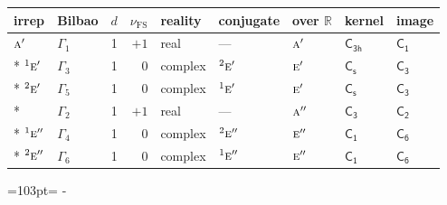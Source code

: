 \documentclass[10pt,a4paper]{article}
\newcommand{\needspace}[1]{\par\penalty-100\begingroup\dimen0=#1\relax\dimen2=\pagegoal
  \advance\dimen2-\pagetotal\ifdim\dimen0>\dimen2\relax\ifdim\dimen2>0pt\vfil\break\fi\fi
  \endgroup}
\numberwithin{equation}{section}
\newcommand{\grp}[1]{\mathsf{#1}}
\newcommand{\irr}[1]{\text{\normalfont\scshape #1}}
\newcommand{\conjpair}[1]{{}^{#1}}
\newcommand{\detbox}[1]{{\setlength{\fboxsep}{1pt}\fbox{#1}}}
\newcommand{\fsind}{\nu_{\mathrm{FS}}}
\begin{document}
{\small\renewcommand{\arraystretch}{1.25}\setlength{\tabcolsep}{4pt}\begin{longtable}{@{}llrrlllll@{}}\toprule
irrep & Bilbao & $d$ & $\fsind$ & reality & conjugate & over $\mathbb{R}$ & kernel & image\\\midrule\endhead
\bottomrule\endfoot\endlastfoot
$\irr{a}'$ & $\Gamma_{1}$ & 1 & $+1$ & real & --- & $\irr{a}'$ & \href{C3h.pdf}{$\grp{C_{3h}}$} & \href{C1.pdf}{$\grp{C_{1}}$}\\*
$\conjpair{1}\irr{e}'$ & $\Gamma_{3}$ & 1 & $0$ & complex & $\conjpair{2}\irr{e}'$ & $\irr{e}'$ & \href{C1v.pdf}{$\grp{C_{s}}$} & \href{C3.pdf}{$\grp{C_{3}}$}\\*
$\conjpair{2}\irr{e}'$ & $\Gamma_{5}$ & 1 & $0$ & complex & $\conjpair{1}\irr{e}'$ & $\irr{e}'$ & \href{C1v.pdf}{$\grp{C_{s}}$} & \href{C3.pdf}{$\grp{C_{3}}$}\\*
\detbox{$\irr{a}''$} & $\Gamma_{2}$ & 1 & $+1$ & real & --- & $\irr{a}''$ & \href{C3.pdf}{$\grp{C_{3}}$} & \href{C2.pdf}{$\grp{C_{2}}$}\\*
$\conjpair{1}\irr{e}''$ & $\Gamma_{4}$ & 1 & $0$ & complex & $\conjpair{2}\irr{e}''$ & $\irr{e}''$ & \href{C1.pdf}{$\grp{C_{1}}$} & \href{C6.pdf}{$\grp{C_{6}}$}\\*
$\conjpair{2}\irr{e}''$ & $\Gamma_{6}$ & 1 & $0$ & complex & $\conjpair{1}\irr{e}''$ & $\irr{e}''$ & \href{C1.pdf}{$\grp{C_{1}}$} & \href{C6.pdf}{$\grp{C_{6}}$}\\
\bottomrule\end{longtable}}
\needspace{103pt}
\end{document}
